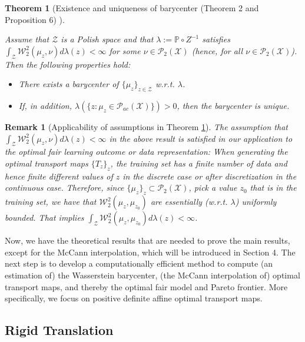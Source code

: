 \documentclass[twoside,11pt]{article}
\newtheorem{thm}{Theorem}[section]{\bfseries}{\itshape}
\newtheorem{rema}{Remark}[section]{\bfseries}{\itshape}
\begin{document}
\begin{thm} [Existence and uniqueness of barycenter \cite{le2017existence}(Theorem 2 and Proposition 6) ] \label{Existence and Uniqueness of Barycenter}

Assume that $\mathcal{Z}$ is a Polish space and that $\lambda := \mathbb{P} \circ Z^{-1}$ satisfies $\int_{\mathcal{Z}} \mathcal{W}_2^2(\mu_z,\nu)d\lambda(z) < \infty$ for some $\nu \in \mathcal{P}_2(\mathcal{X})$ (hence, for all $\nu  \in \mathcal{P}_2(\mathcal{X})$). Then the following properties hold:

\begin{itemize}
\item[1] There exists a barycenter of $\{\mu_z\}_{z \in \mathcal{Z}}$ w.r.t. $\lambda$.
\item[2] If, in addition, $\lambda(\{z: \mu_z \in \mathcal{P}_{ac}(\mathcal{X}) \}) > 0$, then the barycenter is unique.
\end{itemize}

\end{thm}

\begin{rema}[Applicability of assumptions in Theorem \ref{Existence and Uniqueness of Barycenter}]
The assumption that $\int_{\mathcal{Z}} \mathcal{W}_2^2(\mu_z,\nu)d\lambda(z) < \infty$ in the above result is satisfied in our application to the optimal fair learning outcome or data representation: When generating the optimal transport maps $\{T_z\}_z$, the training set has a finite number of data and hence finite different values of $z$ in the discrete case or after discretization in the continuous case. Therefore, since $\{\mu_z\}_z \subset \mathcal{P}_2(\mathcal{X})$, pick a value $z_0$ that is in the training set, we have that $\mathcal{W}_2^2(\mu_{z},\mu_{z_0})$ are essentially (w.r.t. $\lambda$) uniformly bounded. That implies $\int_{\mathcal{Z}} \mathcal{W}_2^2(\mu_z,\mu_{z_0})d\lambda(z) < \infty$.
\end{rema}

Now, we have the theoretical results that are needed to prove the main results, except for the McCann interpolation, which will be introduced in Section 4. The next step is to develop a computationally efficient method to compute (an estimation of) the Wasserstein barycenter, (the McCann interpolation of) optimal transport maps, and thereby the optimal fair model and Pareto frontier. More specifically, we focus on positive definite affine optimal transport maps.

\subsection{Rigid Translation}
\end{document}
